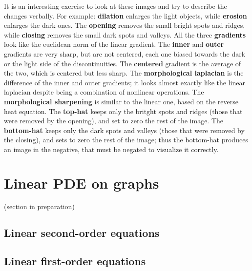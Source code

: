 \begin{gallery}
\end{gallery}

It is an interesting exercise to look at these images and try to describe the
changes verbally.  For example: {\bf dilation} enlarges the light objects,
while {\bf erosion} enlarges the dark ones.  The {\bf opening} removes the
small bright spots and ridges, while {\bf closing} removes the small dark
spots and valleys.  All the three {\bf gradients} look like the euclidean
norm of the linear gradient.  The {\bf inner} and {\bf outer} gradients are
very sharp, but are not centered, each one biased towards the dark or the
light side of the discontinuities.  The {\bf centered} gradient is the
average of the two, which is centered but less sharp.  The {\bf morphological
laplacian} is the difference of the inner and outer gradients; it looks
almost exactly like the linear laplacian despite being a combination of
nonlinear operations.  The {\bf morphological sharpening} is similar to the
linear one, based on the reverse heat equation.  The {\bf top-hat} keeps only
the britght spots and ridges (those that were removed by the opening), and
set to zero the rest of the image.  The {\bf bottom-hat} keeps only the dark
spots and valleys (those that were removed by the closing), and sets to zero
the rest of the image; thus the bottom-hat produces an image in the negative,
that must be negated to visualize it correctly.


\section{Linear PDE on graphs}

(section in preparation)

\subsection{Linear second-order equations}

\subsection{Linear first-order equations}


